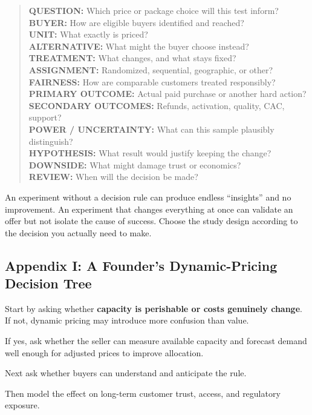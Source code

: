 \begin{quote}
\small
\textbf{QUESTION:} Which price or package choice will this test inform?\\
\textbf{BUYER:} How are eligible buyers identified and reached?\\
\textbf{UNIT:} What exactly is priced?\\
\textbf{ALTERNATIVE:} What might the buyer choose instead?\\
\textbf{TREATMENT:} What changes, and what stays fixed?\\
\textbf{ASSIGNMENT:} Randomized, sequential, geographic, or other?\\
\textbf{FAIRNESS:} How are comparable customers treated responsibly?\\
\textbf{PRIMARY OUTCOME:} Actual paid purchase or another hard action?\\
\textbf{SECONDARY OUTCOMES:} Refunds, activation, quality, CAC, support?\\
\textbf{POWER / UNCERTAINTY:} What can this sample plausibly distinguish?\\
\textbf{HYPOTHESIS:} What result would justify keeping the change?\\
\textbf{DOWNSIDE:} What might damage trust or economics?\\
\textbf{REVIEW:} When will the decision be made?
\end{quote}

An experiment without a decision rule can produce endless ``insights'' and no improvement. An experiment that changes everything at once can validate an offer but not isolate the cause of success. Choose the study design according to the decision you actually need to make.

\subsection*{Appendix I: A Founder's Dynamic-Pricing Decision Tree}

Start by asking whether \textbf{capacity is perishable or costs genuinely change}. If not, dynamic pricing may introduce more confusion than value.

If yes, ask whether the seller can measure available capacity and forecast demand well enough for adjusted prices to improve allocation.

Next ask whether buyers can understand and anticipate the rule.

Then model the effect on long-term customer trust, access, and regulatory exposure.

